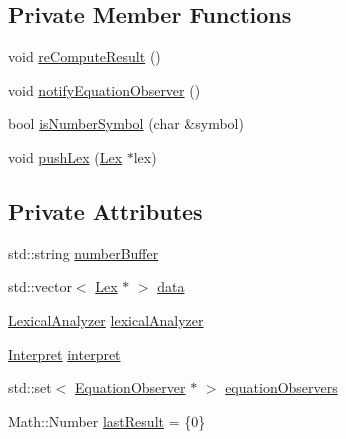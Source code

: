 \subsection*{Private Member Functions}
\begin{DoxyCompactItemize}
\item 
void \hyperlink{classteam22_1_1_calc_1_1_equation_aba44b10dfb0ece96f3e0279d34cec868}{re\+Compute\+Result} ()
\item 
void \hyperlink{classteam22_1_1_calc_1_1_equation_acb90f7fefbd20c57864de0ed691bb65f}{notify\+Equation\+Observer} ()
\item 
bool \hyperlink{classteam22_1_1_calc_1_1_equation_afa4b44cfa408f74370851f7f64f55743}{is\+Number\+Symbol} (char \&symbol)
\item 
void \hyperlink{classteam22_1_1_calc_1_1_equation_af17ea6795813114d578e17109325d5e9}{push\+Lex} (\hyperlink{classteam22_1_1_calc_1_1_lex}{Lex} $\ast$lex)
\end{DoxyCompactItemize}
\subsection*{Private Attributes}
\begin{DoxyCompactItemize}
\item 
std\+::string \hyperlink{classteam22_1_1_calc_1_1_equation_a816d00b732bc472768b41da216a4335c}{number\+Buffer}
\item 
std\+::vector$<$ \hyperlink{classteam22_1_1_calc_1_1_lex}{Lex} $\ast$ $>$ \hyperlink{classteam22_1_1_calc_1_1_equation_ab02c12c6e452d5271f26bbae073ed4dc}{data}
\item 
\hyperlink{classteam22_1_1_calc_1_1_lexical_analyzer}{Lexical\+Analyzer} \hyperlink{classteam22_1_1_calc_1_1_equation_a65aeaa2a279994b03517a22addf31fc1}{lexical\+Analyzer}
\item 
\hyperlink{classteam22_1_1_calc_1_1_interpret}{Interpret} \hyperlink{classteam22_1_1_calc_1_1_equation_a8812a84e9c0f194eba491b0dba0cb015}{interpret}
\item 
std\+::set$<$ \hyperlink{classteam22_1_1_calc_1_1_equation_observer}{Equation\+Observer} $\ast$ $>$ \hyperlink{classteam22_1_1_calc_1_1_equation_a76439666b11701dd1c42507397c5a316}{equation\+Observers}
\item 
Math\+::\+Number \hyperlink{classteam22_1_1_calc_1_1_equation_a7c62440412a33b3b3300e63ff65ffafb}{last\+Result} = \{0\}
\end{DoxyCompactItemize}
